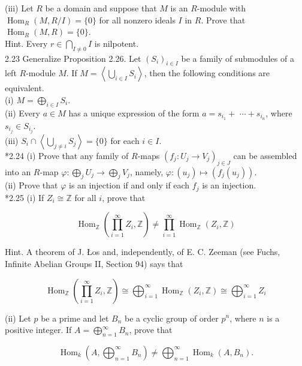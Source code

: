 \documentclass[10pt]{article}
\begin{document}
(iii) Let $R$ be a domain and suppose that $M$ is an $R$-module with $\operatorname{Hom}_{R}(M, R / I)=\{0\}$ for all nonzero ideals $I$ in $R$. Prove that $\operatorname{Hom}_{R}(M, R)=\{0\}$.\\
Hint. Every $r \in \bigcap_{I \neq 0} I$ is nilpotent.\\
2.23 Generalize Proposition 2.26. Let $\left(S_{i}\right)_{i \in I}$ be a family of submodules of a left $R$-module $M$. If $M=\left\langle\bigcup_{i \in I} S_{i}\right\rangle$, then the following conditions are equivalent.\\
(i) $M=\bigoplus_{i \in I} S_{i}$.\\
(ii) Every $a \in M$ has a unique expression of the form $a=s_{i_{1}}+$ $\cdots+s_{i_{n}}$, where $s_{i_{j}} \in S_{i_{j}}$.\\
(iii) $S_{i} \cap\left\langle\bigcup_{j \neq i} S_{j}\right\rangle=\{0\}$ for each $i \in I$.\\
*2.24 (i) Prove that any family of $R$-maps $\left(f_{j}: U_{j} \rightarrow V_{j}\right)_{j \in J}$ can be assembled into an $R$-map $\varphi: \bigoplus_{j} U_{j} \rightarrow \bigoplus_{j} V_{j}$, namely, $\varphi:\left(u_{j}\right) \mapsto\left(f_{j}\left(u_{j}\right)\right)$.\\
(ii) Prove that $\varphi$ is an injection if and only if each $f_{j}$ is an injection.\\
*2.25 (i) If $Z_{i} \cong \mathbb{Z}$ for all $i$, prove that

$$
\operatorname{Hom}_{\mathbb{Z}}\left(\prod_{i=1}^{\infty} Z_{i}, \mathbb{Z}\right) \neq \prod_{i=1}^{\infty} \operatorname{Hom}_{\mathbb{Z}}\left(Z_{i}, \mathbb{Z}\right)
$$

Hint. A theorem of J. Łos and, independently, of E. C. Zeeman (see Fuchs, Infinite Abelian Groups II, Section 94) says that

$$
\operatorname{Hom}_{\mathbb{Z}}\left(\prod_{i=1}^{\infty} Z_{i}, \mathbb{Z}\right) \cong \bigoplus_{i=1}^{\infty} \operatorname{Hom}_{\mathbb{Z}}\left(Z_{i}, \mathbb{Z}\right) \cong \bigoplus_{i=1}^{\infty} Z_{i}
$$

(ii) Let $p$ be a prime and let $B_{n}$ be a cyclic group of order $p^{n}$, where $n$ is a positive integer. If $A=\bigoplus_{n=1}^{\infty} B_{n}$, prove that

$$
\operatorname{Hom}_{k}\left(A, \bigoplus_{n=1}^{\infty} B_{n}\right) \neq \bigoplus_{n=1}^{\infty} \operatorname{Hom}_{k}\left(A, B_{n}\right) .
$$
\end{document}
